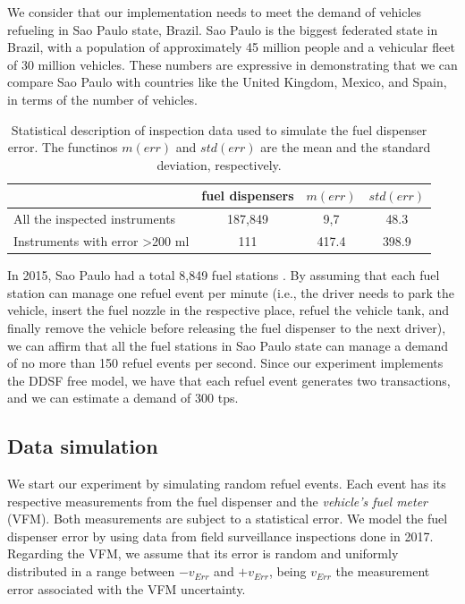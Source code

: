 \documentclass[sigplan]{acmart}
\begin{document}
We consider that our implementation needs to meet the demand of vehicles refueling in Sao Paulo state, Brazil.
Sao Paulo is the biggest federated state in Brazil, with a population of approximately 45 million people and a vehicular fleet of 30 million vehicles.
These numbers are expressive in demonstrating that we can compare Sao Paulo with countries like the United Kingdom, Mexico, and Spain, in terms of the number of vehicles.

\begin{table}[t!]
\centering
\caption{Statistical description of inspection data used to simulate the fuel dispenser error. The functinos $m(err)$ and $std(err)$ are the mean and the standard deviation, respectively.}
\label{t:dataset}
\begin{tabular}{|l|c|c|c|}
\hline
\textbf{}                                  & \multicolumn{1}{l|}{\textbf{fuel dispensers}} & \multicolumn{1}{l|}{\textbf{$m(err)$}} & \multicolumn{1}{l|}{\textbf{$std(err)$}} \\ \hline
All the inspected instruments              & 187,849                                      & 9,7                                    & 48.3                                     \\ \hline
Instruments with error \textgreater 200 ml & 111                                          & 417.4                                  & 398.9                                    \\ \hline
\end{tabular}
\end{table}

In 2015, Sao Paulo had a total 8,849 fuel stations \cite{Beteto2016}.
By assuming that each fuel station can manage one refuel event per minute (i.e., the driver needs to park the vehicle, insert the fuel nozzle in the respective place, refuel the vehicle tank, and finally remove the vehicle before releasing the fuel dispenser to the next driver), we can affirm that all the fuel stations in Sao Paulo state can manage a demand of no more than 150 refuel events per second.
Since our experiment implements the DDSF free model, we have that each refuel event generates two transactions, and we can estimate a demand of 300 tps.

\subsection{Data simulation}
We start our experiment by simulating random refuel events.
Each event has its respective measurements from the fuel dispenser and the \emph{vehicle's fuel meter} (VFM).
Both measurements are subject to a statistical error.
We model the fuel dispenser error by using data from field surveillance inspections done in 2017.
Regarding the VFM, we assume that its error is random and uniformly distributed in a range between $-v_{Err}$ and $+v_{Err}$, being $v_{Err}$ the measurement error associated with the VFM uncertainty.
\end{document}
